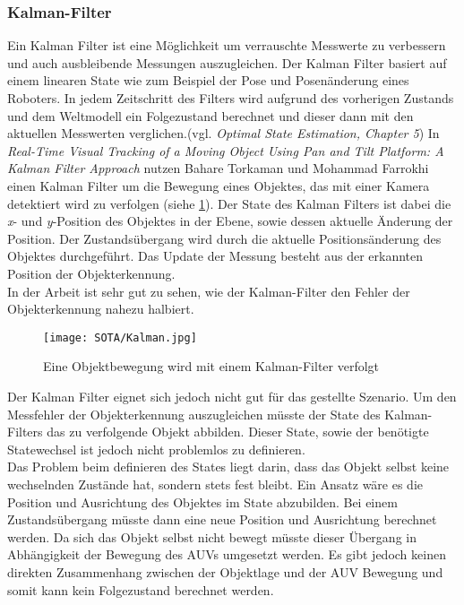\subsubsection{Kalman-Filter}
Ein Kalman Filter ist eine Möglichkeit um verrauschte Messwerte zu verbessern und auch ausbleibende Messungen auszugleichen. Der Kalman Filter basiert auf einem linearen State wie zum Beispiel der Pose und Posenänderung eines Roboters. In jedem Zeitschritt des Filters wird aufgrund des vorherigen Zustands und dem Weltmodell ein Folgezustand berechnet und dieser dann mit den aktuellen Messwerten verglichen.(vgl. \textit{Optimal State Estimation, Chapter 5}\cite{simon2006optimal})
In \textit{Real-Time Visual Tracking of a Moving Object Using Pan and Tilt Platform: A Kalman Filter Approach}\cite{torkaman2012real} nutzen Bahare Torkaman und Mohammad Farrokhi einen Kalman Filter um die Bewegung eines Objektes, das mit einer Kamera detektiert wird zu verfolgen (siehe \ref{kalmanFilter}). Der State des Kalman Filters ist dabei die \textit{x}- und \textit{y}-Position des Objektes in der Ebene, sowie dessen aktuelle Änderung der Position. Der Zustandsübergang wird durch die aktuelle Positionsänderung des Objektes durchgeführt. Das Update der Messung besteht aus der erkannten Position der Objekterkennung.\\
In der Arbeit ist sehr gut zu sehen, wie der Kalman-Filter den Fehler der Objekterkennung nahezu halbiert.\\
\begin{figure}[H]
\centering
\texttt{[image: SOTA/Kalman.jpg]}
\caption{Eine Objektbewegung wird mit einem Kalman-Filter verfolgt}
\label{kalmanFilter}
\end{figure}
Der Kalman Filter eignet sich jedoch nicht gut für das gestellte Szenario. Um den Messfehler der Objekterkennung auszugleichen müsste der State des Kalman-Filters das zu verfolgende Objekt abbilden. Dieser State, sowie der benötigte Statewechsel ist jedoch nicht problemlos zu definieren.\\
Das Problem beim definieren des States liegt darin, dass das Objekt selbst keine wechselnden Zustände hat, sondern stets fest bleibt. Ein Ansatz wäre es die Position und Ausrichtung des Objektes im State abzubilden. Bei einem Zustandsübergang müsste dann eine neue Position und Ausrichtung berechnet werden. Da sich das Objekt selbst nicht bewegt müsste dieser Übergang in Abhängigkeit der Bewegung des AUVs umgesetzt werden. Es gibt jedoch keinen direkten Zusammenhang zwischen der Objektlage und der AUV Bewegung und somit kann kein Folgezustand berechnet werden. 
